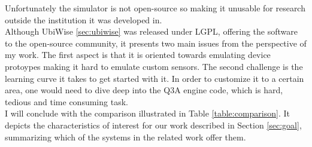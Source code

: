 Unfortunately the simulator is not open-source so making it unusable for research outside the institution it was developed in.\\

Although UbiWise \ref{sec:ubiwise} was released under LGPL\cite{lgpl}, offering the software to the open-source community, it presents two main issues from the perspective of my work. The first aspect is that it is oriented towards emulating device protoypes making it hard to emulate custom sensors. The second challenge is the learning curve it takes to get started with it. In order to customize it to a certain area, one would need to dive deep into the Q3A engine code, which is hard, tedious and time consuming task.\\

I will conclude with the comparison illustrated in Table \ref{table:comparison}. It depicts the characteristics of interest for our work described in Section \ref{sec:goal}, summarizing which of the systems in the related work offer them.

